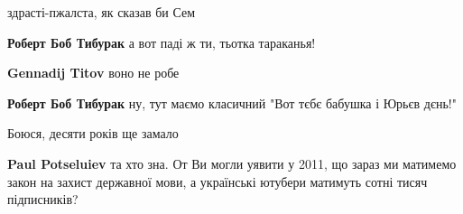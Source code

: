 \begin{itemize}
 
здрасті-пжалста, як сказав би Сем

\begin{itemize}
 
\textbf{Роберт Боб Тибурак} а вот паді ж ти, тьотка тараканья!

 
\textbf{Gennadij Titov} воно не робе

 
\textbf{Роберт Боб Тибурак} ну, тут маємо класичний "Вот тєбє бабушка і Юрьєв дєнь!"
\end{itemize}

 
Боюся, десяти років ще замало

\begin{itemize}
 
\textbf{Paul Potseluiev} та хто зна. От Ви могли уявити у 2011, що зараз ми матимемо закон на захист державної мови, а українські ютубери матимуть сотні тисяч підписників?


\end{itemize}
\end{itemize}
